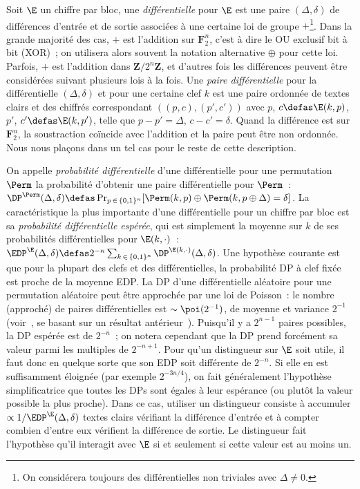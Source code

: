 Soit $\E$ un chiffre par bloc, une \emph{différentielle} pour $\E$ est une paire
$(\Delta,\delta)$ de différences d'entrée et de sortie associées à une certaine loi de groupe
$+$\footnote{On considérera toujours des différentielles non triviales avec $\Delta \neq 0$.}.
Dans la grande majorité des cas, $+$ est l'addition sur $\mathbf{F}_2^n$,
c'est à dire le OU exclusif bit à bit (XOR)~; on utilisera alors souvent la notation alternative $\oplus$ pour cette loi.
Parfois, $+$ est l'addition dans $\mathbf{Z}/2^n\mathbf{Z}$, et d'autres fois les différences peuvent être considérées suivant plusieurs lois à la fois.
Une \emph{paire différentielle} pour la différentielle $(\Delta,\delta)$ et pour une certaine clef $k$
est une paire ordonnée de textes clairs et des chiffrés correspondant $((p,c), (p',c'))$ avec 
$p$, $c \defas \E(k,p)$, $p'$, $c' \defas \E(k,p')$, telle que $p - p' = \Delta$, $c - c' = \delta$. Quand la différence est sur $\mathbf{F}_2^n$,
la soustraction coïncide avec l'addition et la paire peut être non ordonnée. Nous nous plaçons dans un tel cas pour le reste de cette description.

On appelle \emph{probabilité différentielle} d'une différentielle pour une permutation $\Perm$ la probabilité d'obtenir une
paire différentielle pour $\Perm$~:
$\DP^{\Perm}(\Delta,\delta) \defas \Pr_{p\,\in\,\{0,1\}^n}[\Perm(k,p) \oplus \Perm(k,p \oplus \Delta) = \delta]$.
La caractéristique la plus importante d'une différentielle pour un chiffre par bloc est sa \emph{probabilité différentielle espérée},
qui est simplement la moyenne sur $k$ de ses probabilités différentielles pour $\E(k,\cdot)$~:
$\EDP^{\E}(\Delta,\delta) \defas 2^{-\kappa}\sum_{k\,\in\,\{0,1\}^\kappa} \DP^{\E(k,\cdot)}(\Delta,\delta)$.
Une hypothèse courante est que pour la plupart des clefs et des différentielles, la probabilité DP à clef fixée
est proche de la moyenne EDP.
La DP d'une différentielle aléatoire pour une permutation aléatoire peut être approchée par une loi de Poisson~:
le nombre (approché) de paires différentielles est
$\sim \poi(2^{-1})$, de moyenne et variance $2^{-1}$
(voir~\cite{DBLP:journals/jmc/DaemenR07}, se basant sur un résultat antérieur~\cite{DBLP:journals/joc/OConnor95}).
Puisqu'il y a
$2^{n-1}$ paires possibles, la DP espérée est de $2^{-n}$~; on notera cependant que la DP prend forcément sa valeur parmi les multiples de $2^{-n+1}$.
Pour qu'un distingueur sur $\E$ soit utile, il faut donc en quelque sorte que son EDP soit différente de $2^{-n}$. Si elle en est suffisamment éloignée
(par exemple $2^{-3n/4}$), on fait généralement l'hypothèse simplificatrice que toutes les DPs sont égales à leur espérance (ou plutôt la valeur
possible la plus proche).
Dans ce cas,
utiliser un distingueur consiste à accumuler
$\propto 1/\EDP^{\E}(\Delta,\delta)$ textes clairs vérifiant la différence d'entrée et à compter combien d'entre eux vérifient la différence de sortie.
Le distingueur fait l'hypothèse qu'il
interagit avec $\E$ si et seulement si cette valeur est au moins un.


